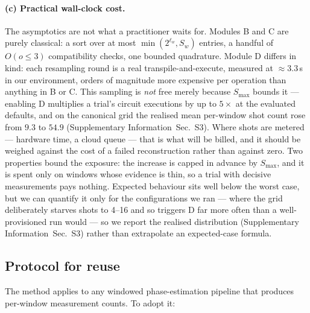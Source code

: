 \documentclass[preprint,11pt]{elsarticle}
\newcommand{\SI}{Supplementary Information}
\newcommand{\SItables}{\SI{}~Sec.~S3}
\newcommand{\Smax}{S_{\max}}
\begin{document}
\paragraph{(c) Practical wall-clock cost.} The asymptotics are not what a
practitioner waits for. Modules B and C are purely classical: a sort over
at most $\min(2^{\ell_w},S_w)$ entries, a handful of $O(o\le3)$
compatibility checks, one bounded quadrature. Module D differs in kind:
each resampling round is a real transpile-and-execute, measured at
${\approx}3.3$\,s in our environment, orders of magnitude more expensive
per operation than anything in B or C. This sampling is \emph{not} free
merely because $\Smax$ bounds it --- enabling D multiplies a trial's
circuit executions by up to $5\times$ at the evaluated defaults, and on
the canonical grid the realised mean per-window shot count rose from
$9.3$ to $54.9$ (\SItables{}). Where shots are metered --- hardware time,
a cloud queue --- that is what will be billed, and it should be weighed
against the cost of a failed reconstruction rather than against zero. Two
properties bound the exposure: the increase is capped in advance by
$\Smax$, and it is spent only on windows whose evidence is thin, so a
trial with decisive measurements pays nothing. Expected behaviour sits
well below the worst case, but we can quantify it only for the
configurations we ran --- where the grid deliberately starves shots to
4--16 and so triggers D far more often than a well-provisioned run
would --- so we report the realised distribution (\SItables{}) rather than
extrapolate an expected-case formula.

\subsection{Protocol for reuse}
\label{sec:protocol}

The method applies to any windowed phase-estimation pipeline that
produces per-window measurement counts. To adopt it:
\end{document}
